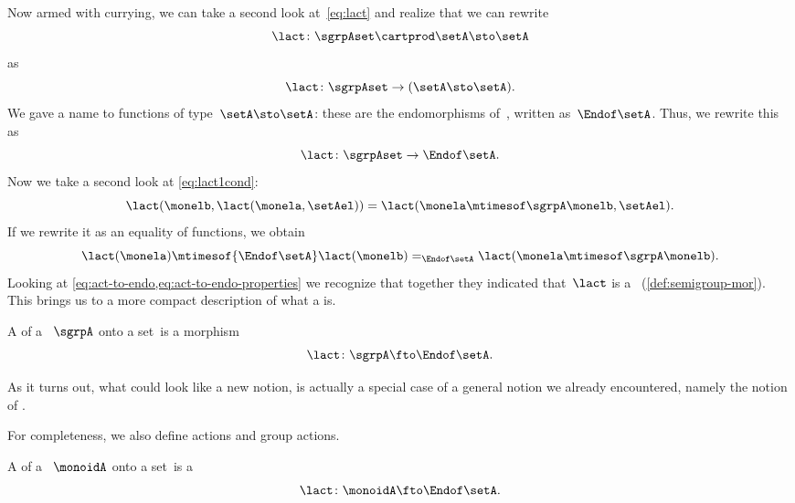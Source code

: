 Now armed with currying, we can take a second look at~\cref{eq:lact} and realize that we can rewrite
\begin{equation}
    \label{eq:currying-lact-1}
    \lact \colon \sgrpAset \cartprod \setA \sto \setA
\end{equation}
as
\begin{equation}
    \label{eq:currying-lact-2}
    \lact \colon \sgrpAset \to (\setA \sto \setA).
\end{equation}
%
We gave a name to functions of type~$\setA \sto \setA$: these are the endomorphisms of~\setA, written as~$\Endof\setA$.
Thus, we rewrite this as
%
\begin{equation}
    \label{eq:act-to-endo}
    \lact \colon \sgrpAset \to \Endof\setA.
\end{equation}
%
Now we take a second look at \cref{eq:lact1cond}:
%
\begin{equation}
    \label{eq:lact1cond-2}
    \lact(\monelb, \lact(\monela, \setAel)) = \lact(\monela \mtimesof\sgrpA \monelb, \setAel).
\end{equation}
%
If we rewrite it as an equality of functions, we obtain
%
\begin{equation}
    \label{eq:act-to-endo-properties}
    \lact(\monela) \mtimesof{\Endof\setA} \lact(\monelb) =_{\Endof\setA} \lact(\monela \mtimesof\sgrpA \monelb).
\end{equation}
%
Looking at \cref{eq:act-to-endo,eq:act-to-endo-properties} we recognize that together they indicated that~$\lact$ is a ~(\cref{def:semigroup-mor}).
This brings us to a more compact description of what a  is.

\begin{ctdefinition}
    \label{def:semigroup-cov-action}
    A  of a ~$\sgrpA$ onto a set~\setA is a  morphism
    \begin{equation}
        \label{eq:act-semigroup}
        \lact \colon \sgrpA \fto \Endof\setA.
    \end{equation}
\end{ctdefinition}

As it turns out, what could look like a new notion, is actually a special case of a general notion we already encountered, namely the notion of .

For completeness, we also define  actions and group actions.

\begin{ctdefinition}
    \label{def:monoid-cov-action}
    A  of a ~$\monoidA$ onto a set~\setA is a 
    \begin{equation}
        \label{eq:act-monoid}
        \lact \colon \monoidA \fto \Endof\setA.
    \end{equation}
\end{ctdefinition}

